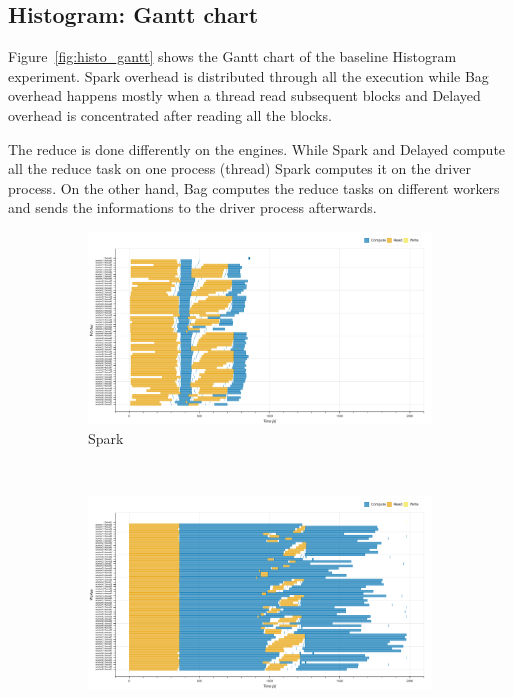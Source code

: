 \documentclass[conference]{IEEEtran}
\begin{document}
\subsection{Histogram: Gantt chart}
Figure~\ref{fig:histo_gantt} shows the Gantt chart of the baseline Histogram
experiment. Spark overhead is distributed through all the execution while Bag
overhead happens mostly when a thread read subsequent blocks and Delayed overhead is
concentrated after reading all the blocks.

The reduce is done differently on the engines. While Spark and Delayed compute all
the reduce task on one process (thread) Spark computes it on the driver process. On
the other hand, Bag computes the reduce tasks on different workers and sends the
informations to the driver process afterwards.

\begin{figure}[!htb]
    \centering
    \begin{subfigure}[b]{\columnwidth}
        \includegraphics[clip,width=\columnwidth]{images/spark_histo_gantt.png}
        \caption{Spark}\label{fig:histo_spark_gantt}
    \end{subfigure}
    \\
    \begin{subfigure}[b]{\columnwidth}
        \includegraphics[clip,width=\columnwidth]{images/bag_histo_gantt.png}%

\end{subfigure}
\end{figure}
\end{document}
